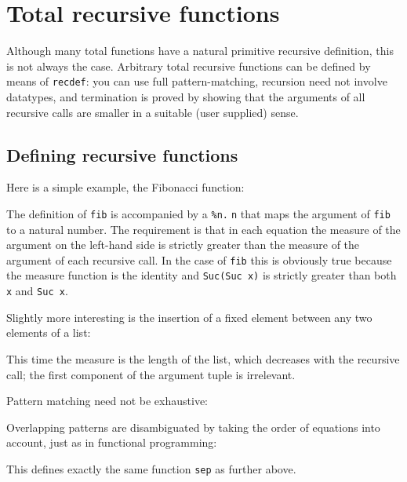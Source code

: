 \section{Total recursive functions}
\label{sec:recdef}


Although many total functions have a natural primitive recursive definition,
this is not always the case. Arbitrary total recursive functions can be
defined by means of \texttt{recdef}: you can use full pattern-matching,
recursion need not involve datatypes, and termination is proved by showing
that the arguments of all recursive calls are smaller in a suitable (user
supplied) sense.

\subsection{Defining recursive functions}

Here is a simple example, the Fibonacci function:
\begin{ttbox}
\end{ttbox}
The definition of \texttt{fib} is accompanied by a 
\texttt{\%n.$\;$n} that maps the argument of \texttt{fib} to a natural
number. The requirement is that in each equation the measure of the argument
on the left-hand side is strictly greater than the measure of the argument of
each recursive call. In the case of \texttt{fib} this is obviously true
because the measure function is the identity and \texttt{Suc(Suc~x)} is
strictly greater than both \texttt{x} and \texttt{Suc~x}.

Slightly more interesting is the insertion of a fixed element
between any two elements of a list:
\begin{ttbox}
\end{ttbox}
This time the measure is the length of the list, which decreases with the
recursive call; the first component of the argument tuple is irrelevant.

Pattern matching need not be exhaustive:
\begin{ttbox}
\end{ttbox}

Overlapping patterns are disambiguated by taking the order of equations into
account, just as in functional programming:
\begin{ttbox}
\end{ttbox}
This defines exactly the same function \texttt{sep} as further above.

